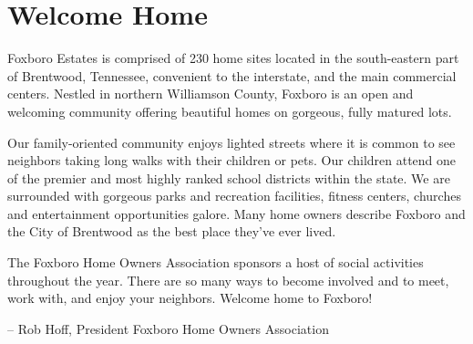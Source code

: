 \section{Welcome Home}

Foxboro Estates is comprised of 230 home sites located in the
south-eastern part of Brentwood, Tennessee, convenient to the interstate,
and the main commercial centers. Nestled in northern Williamson County,
Foxboro is an open and welcoming community offering beautiful homes on
gorgeous, fully matured lots.

Our family-oriented community enjoys lighted streets where it is common
to see neighbors taking long walks with their children or pets. Our
children attend one of the premier and most highly ranked school districts
within the state. We are surrounded with gorgeous parks and recreation
facilities, fitness centers, churches and entertainment opportunities
galore. Many home owners describe Foxboro and the City of Brentwood as
the best place they've ever lived.

The Foxboro Home Owners Association sponsors a host of social activities
throughout the year. There are so many ways to become involved and to
meet, work with, and enjoy your neighbors. Welcome home to Foxboro!

-- Rob Hoff, President Foxboro Home Owners Association
